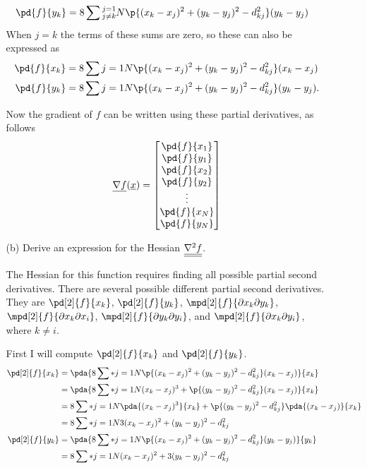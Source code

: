 \documentclass[11pt, oneside]{article}
\begin{document}
\begin{enumerate}
\begin{enumerate}
\begin{align*}
          \pd{f}{y_k} &= 8 \sum{\substack{j = 1 \\ j \neq k}}{N}{\p{(x_k - x_j)^2 + (y_k - y_j)^2 - d_{kj}^2}(y_k - y_j)}
        \end{align*}
        When $j = k$ the terms of these sums are zero, so these can also be expressed as
        \begin{align*}
          \pd{f}{x_k} &= 8 \sum{j = 1}{N}{\p{(x_k - x_j)^2 + (y_k - y_j)^2 - d_{kj}^2}(x_k - x_j)} \\
          \pd{f}{y_k} &= 8 \sum{j = 1}{N}{\p{(x_k - x_j)^2 + (y_k - y_j)^2 - d_{kj}^2}(y_k - y_j)}.
        \end{align*}

        Now the gradient of $f$ can be written using these partial derivatives, as follows
        \[
          \v{\nabla f}(\v{x}) =
          \begin{bmatrix}
            \pd{f}{x_1} \\
            \pd{f}{y_1} \\
            \pd{f}{x_2} \\
            \pd{f}{y_2} \\
            \vdots \\
            \pd{f}{x_N} \\
            \pd{f}{y_N} \\
          \end{bmatrix}
        \]

      \item[(b)] %
        Derive an expression for the Hessian $\underline{\underline{\nabla^2 f}}$.

        The Hessian for this function requires finding all possible partial
        second derivatives.
        There are several possible different partial second derivatives.
        They are $\pd[2]{f}{x_k}$, $\pd[2]{f}{y_k}$,
        $\mpd[2]{f}{\partial x_k \partial y_k}$,
        $\mpd[2]{f}{\partial x_k \partial x_i}$,
        $\mpd[2]{f}{\partial y_k \partial y_i}$, and 
        $\mpd[2]{f}{\partial x_k \partial y_i}$, where $k \neq i$.

        First I will compute $\pd[2]{f}{x_k}$ and $\pd[2]{f}{y_k}$.
        \begin{align*}
          \pd[2]{f}{x_k} &= \pda{8 \sum*{j = 1}{N}{\p{(x_k - x_j)^2 + (y_k - y_j)^2 - d_{kj}^2}(x_k - x_j)}}{x_k} \\
          &= \pda{8 \sum*{j = 1}{N}{(x_k - x_j)^3 + \p{(y_k - y_j)^2 - d_{kj}^2}(x_k - x_j)}}{x_k} \\
          &= 8 \sum*{j = 1}{N}{\pda{(x_k - x_j)^3}{x_k} + \p{(y_k - y_j)^2 - d_{kj}^2}\pda{(x_k - x_j)}{x_k}} \\
          &= 8 \sum*{j = 1}{N}{3(x_k - x_j)^2 + (y_k - y_j)^2 - d_{kj}^2} \\
          \pd[2]{f}{y_k} &= \pda{8 \sum*{j = 1}{N}{\p{(x_k - x_j)^2 + (y_k - y_j)^2 - d_{kj}^2}(y_k - y_j)}}{y_k} \\
          &= 8 \sum*{j = 1}{N}{(x_k - x_j)^2 + 3(y_k - y_j)^2 - d_{kj}^2}
        \end{align*}


\end{enumerate}
\end{enumerate}
\end{document}
